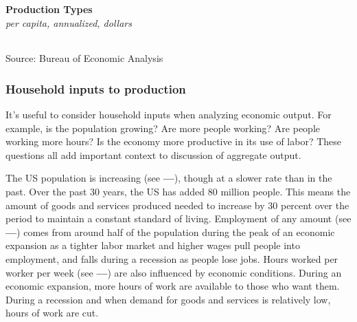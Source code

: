 \documentclass{report}
\begin{document}
\begin{minipage}{0.76\textwidth}

\normalsize \textbf{Production Types}\\
\footnotesize{\textit{per capita, annualized, dollars}}\\
\hspace{-2mm}  \setlength{\tabcolsep}{3.7pt} \color{black!90}
		{\renewcommand{\arraystretch}{1.6}
		 \begin{tabular}{p{38mm} R{12.8mm} R{12.8mm} R{12.8mm} R{12.8mm} R{12.8mm}}
			 \hline
		\end{tabular}}
\vspace{-2mm}

\footnotesize{Source: Bureau of Economic Analysis}
\end{minipage}
\newpage
\begin{minipage}{0.76\textwidth}
\subsubsection*{\color{black!70}\seriffont Household inputs to production}
\small It's useful to consider household inputs when analyzing economic output. For example, is the population growing? Are more people working? Are people working more hours? Is the economy more productive in its use of labor? These questions all add important context to discussion of aggregate output.

The US population is increasing (see {\color{lime!90!green}\textbf{---}}), though at a slower rate than in the past. Over the past 30 years, the US has added 80 million people. This means the amount of goods and services produced needed to increase by 30 percent over the period to maintain a constant standard of living. Employment of any amount (see {\color{green!30!teal!90!black}\textbf{---}}) comes from around half of the population during the peak of an economic expansion as a tighter labor market and higher wages pull people into employment, and falls during a recession as people lose jobs. Hours worked per worker per week (see {\color{blue}\textbf{---}}) are also influenced by economic conditions. During an economic expansion, more hours of work are available to those who want them. During a recession and when demand for goods and services is relatively low, hours of work are cut.
\end{minipage}
\vspace{2mm}
\end{document}
